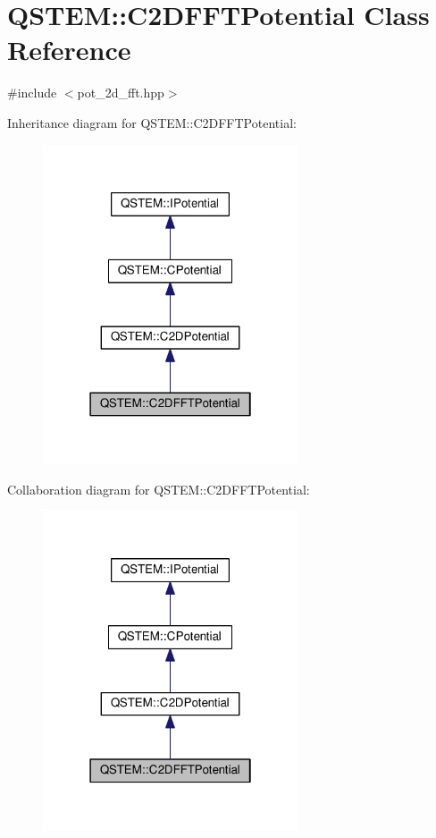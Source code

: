 \hypertarget{class_q_s_t_e_m_1_1_c2_d_f_f_t_potential}{\section{Q\-S\-T\-E\-M\-:\-:C2\-D\-F\-F\-T\-Potential Class Reference}
\label{class_q_s_t_e_m_1_1_c2_d_f_f_t_potential}
}


{\ttfamily \#include $<$pot\-\_\-2d\-\_\-fft.\-hpp$>$}



Inheritance diagram for Q\-S\-T\-E\-M\-:\-:C2\-D\-F\-F\-T\-Potential\-:
\nopagebreak
\begin{figure}[H]
\begin{center}
\leavevmode
\includegraphics[width=214pt]{class_q_s_t_e_m_1_1_c2_d_f_f_t_potential__inherit__graph}
\end{center}
\end{figure}


Collaboration diagram for Q\-S\-T\-E\-M\-:\-:C2\-D\-F\-F\-T\-Potential\-:
\nopagebreak
\begin{figure}[H]
\begin{center}
\leavevmode
\includegraphics[width=214pt]{class_q_s_t_e_m_1_1_c2_d_f_f_t_potential__coll__graph}
\end{center}
\end{figure}
